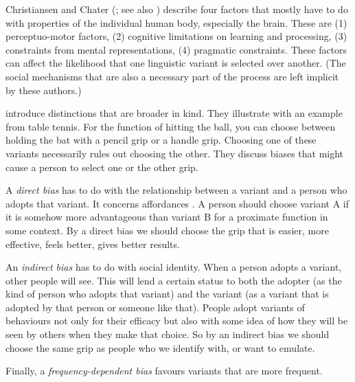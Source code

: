 Christiansen and Chater (\citeyear{christiansen_language_2008}; see also \citealt{chater_language_2010}) describe four factors that mostly have to do with properties of the 
individual human body, especially the brain. These are (1) perceptuo-motor 
factors, (2) cognitive limitations on learning and processing, (3) 
constraints from mental representations, (4) pragmatic constraints. 
These factors can affect the likelihood that one linguistic variant is 
selected over another. (The social mechanisms that are also a 
necessary part of the process are left implicit by these authors.) 



\citet{boyd_culture_1985} introduce distinctions that are 
broader in kind. They illustrate with an example from table tennis. For 
the function of hitting the ball, you can choose between holding the bat 
with a pencil grip or a handle grip. Choosing one of these variants 
necessarily rules out choosing the other. They discuss biases 
that might cause a person to select one or the other grip. 



A \textit{direct bias} has to do with the relationship between a variant 
and a person who adopts that variant. It concerns affordances \citep{gibson_ecological_1979}. A person should choose variant A if it is somehow more advantageous 
than variant B for a proximate function in some context. By a 
direct bias we should choose the grip that is easier, more effective, 
feels better, gives better results. 



An \textit{indirect bias} has to do with social 
identity. When a person adopts a variant, other people will see. This will lend a certain status to both the adopter (as 
the kind of person who adopts that variant) and the variant (as a 
variant that is adopted by that person or someone like that). People adopt 
variants of behaviours not only for their efficacy but also 
with some idea of how they will be seen by others when they make that 
choice. So by an indirect bias we should choose the same grip as people 
who we identify with, or want to emulate. 



Finally, a \textit{frequency-dependent bias} favours variants that are 
more frequent. 



